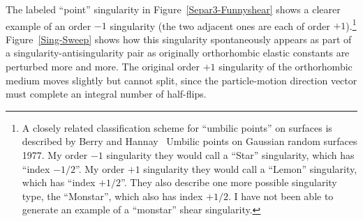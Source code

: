 The labeled ``point'' singularity in Figure~\ref{Separ3-Funnyshear}
shows a clearer example of an order $-1$ singularity (the two adjacent
ones are each of order $+1$).\footnote{A closely related classification
scheme for ``umbilic points'' on surfaces is described by
Berry and Hannay~
{Umbilic points on Gaussian random surfaces}
{1977}. My order $-1$ singularity they would call a ``Star''
singularity, which has ``index $-1/2$''.
My order $+1$ singularity they would
call a ``Lemon'' singularity, which has ``index $+1/2$''.
They also describe one more possible singularity type, the ``Monstar'',
which also has index $+1/2$.
I have not been able to generate an example of
a ``monstar'' shear singularity.}
Figure~\ref{Sing-Sweep} shows how this singularity spontaneously
appears as part of a singularity-antisingularity pair as originally
orthorhombic elastic constants are perturbed more and more.
The original order $+1$ singularity of the orthorhombic medium moves
slightly but cannot split, since the particle-motion direction vector
must complete an integral number of half-flips.
